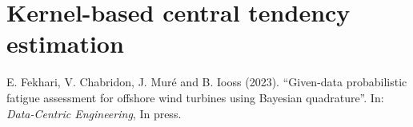 \cleardoublepage
\chapter{Kernel-based central tendency estimation}
\label{chpt:4}
\hfill
\localtableofcontents
\newpage



\begin{tcolorbox}[colback=gray!5!white, colframe=gray!5!white, coltitle=gray!70!white, coltext=gray!60!white, title=\textbf{This chapter is adapted from the following reference:}]
    E. Fekhari, V. Chabridon, J. Muré and B. Iooss (2023). ``Given-data probabilistic fatigue assessment for offshore wind turbines using Bayesian quadrature''. In: \textit{Data-Centric Engineering}, In press.
\end{tcolorbox}


